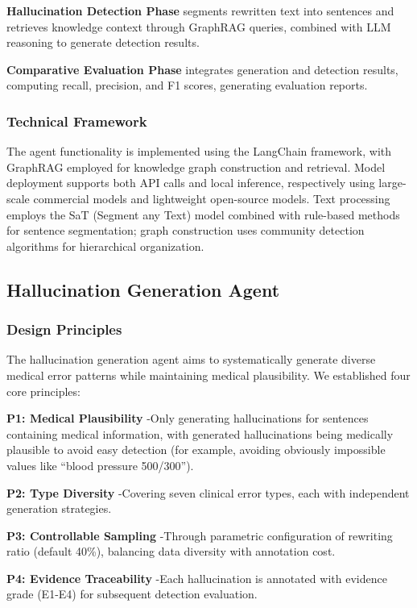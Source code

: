 \documentclass[11pt]{article}
\begin{document}
\textbf{Hallucination Detection Phase} segments rewritten text into sentences and retrieves knowledge context through GraphRAG queries, combined with LLM reasoning to generate detection results.

\textbf{Comparative Evaluation Phase} integrates generation and detection results, computing recall, precision, and F1 scores, generating evaluation reports.

\subsubsection{Technical Framework}

The agent functionality is implemented using the LangChain framework, with GraphRAG employed for knowledge graph construction and retrieval. Model deployment supports both API calls and local inference, respectively using large-scale commercial models and lightweight open-source models. Text processing employs the SaT (Segment any Text) model \citep{frohmann2024segmentAnyText} combined with rule-based methods for sentence segmentation; graph construction uses community detection algorithms for hierarchical organization.

\subsection{Hallucination Generation Agent}

\subsubsection{Design Principles}

The hallucination generation agent aims to systematically generate diverse medical error patterns while maintaining medical plausibility. We established four core principles:

\textbf{P1: Medical Plausibility} -Only generating hallucinations for sentences containing medical information, with generated hallucinations being medically plausible to avoid easy detection (for example, avoiding obviously impossible values like ``blood pressure 500/300'').

\textbf{P2: Type Diversity} -Covering seven clinical error types, each with independent generation strategies.

\textbf{P3: Controllable Sampling} -Through parametric configuration of rewriting ratio (default 40\%), balancing data diversity with annotation cost.

\textbf{P4: Evidence Traceability} -Each hallucination is annotated with evidence grade (E1-E4) for subsequent detection evaluation.
\end{document}
